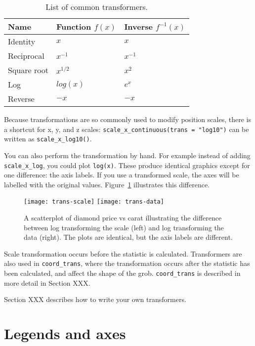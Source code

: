 \begin{table}
  \centering
  \begin{tabular}{lll}
    Name & Function $f(x)$ & Inverse $f^{-1}(x)$ \\
    \hline
    Identity    & $x$         & $x$      \\
    Reciprocal  & $x^{-1}$    & $x^{-1}$ \\
    Square root & $x^{1/2}$   & $x ^ 2$  \\
    Log         & $log(x)$    & $e ^ x$  \\
    Reverse     & $-x$        & $-x$     \\
  \end{tabular}
  \caption{List of common transformers.}
  \label{tbl:common-trans}
\end{table}

Because transformations are so commonly used to modify position scales, there is a shortcut for x, y, and z scales: \verb|scale_x_continuous(trans = "log10")| can be written as \verb|scale_x_log10()|.

You can also perform the transformation by hand.  For example instead of adding {\tt scale\_x\_log}, you could plot {\tt log(x)}.  These produce identical graphics except for one difference: the axis labels.  If you use a transformed scale, the axes will be labelled with the original values.  Figure~\ref{fig:trans} illustrates this difference.

\begin{figure}[htbp]
  \centering
    \texttt{[image: trans-scale]}
    \texttt{[image: trans-data]}
  \caption{A scatterplot of diamond price vs carat illustrating the difference between log transforming the scale (left) and log transforming the data (right).  The plots are identical, but the axis labels are different.}
  \label{fig:trans}
\end{figure}

Scale transformation occurs before the statistic is calculated.  Transformers are also used in \verb|coord_trans|, where the transformation occurs after the statistic has been calculated, and affect the shape of the grob.  \verb|coord_trans| is described in more detail in Section XXX.

Section XXX describes how to write your own transformers.

\section{Legends and axes}
\label{sec:legends_and_axes}

